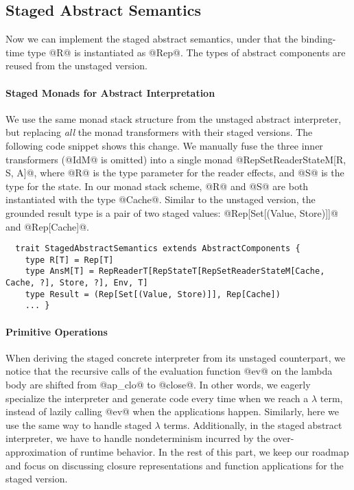 \subsection{Staged Abstract Semantics}

Now we can implement the staged abstract semantics, under that the binding-time
type @R@ is instantiated as @Rep@. The types of abstract components are reused
from the unstaged version.

\paragraph{Staged Monads for Abstract Interpretation}
We use the same monad stack structure from the unstaged abstract interpreter,
but replacing \textit{all} the monad transformers with their staged versions. The
following code snippet shows this change.
We manually fuse the three inner transformers (@IdM@ is omitted) into a single
monad @RepSetReaderStateM[R, S, A]@, where @R@ is the type parameter for the
reader effects, and @S@ is the type for the state.  In our monad stack scheme,
@R@ and @S@ are both instantiated with the type @Cache@. Similar to the unstaged
version, the grounded result type is a pair of two staged values:
@Rep[Set[(Value, Store)]]@ and @Rep[Cache]@.
\begin{lstlisting}
  trait StagedAbstractSemantics extends AbstractComponents {
    type R[T] = Rep[T]
    type AnsM[T] = RepReaderT[RepStateT[RepSetReaderStateM[Cache, Cache, ?], Store, ?], Env, T]
    type Result = (Rep[Set[(Value, Store)]], Rep[Cache])
    ... }
\end{lstlisting}

\paragraph{Primitive Operations} 
When deriving the staged concrete interpreter from its unstaged counterpart, we
notice that the recursive calls of the evaluation function @ev@ on the lambda
body are shifted from @ap_clo@ to @close@. In other words, we eagerly
specialize the interpreter and generate code every time when we reach a
$\lambda$ term, instead of lazily calling @ev@ when the applications happen.
Similarly, here we use the same way to handle staged $\lambda$ terms.  Additionally,
in the staged abstract interpreter, we have to handle nondeterminism incurred
by the over-approximation of runtime behavior.  In the rest of this part, we
keep our roadmap and focus on discussing closure representations and function
applications for the staged version.

